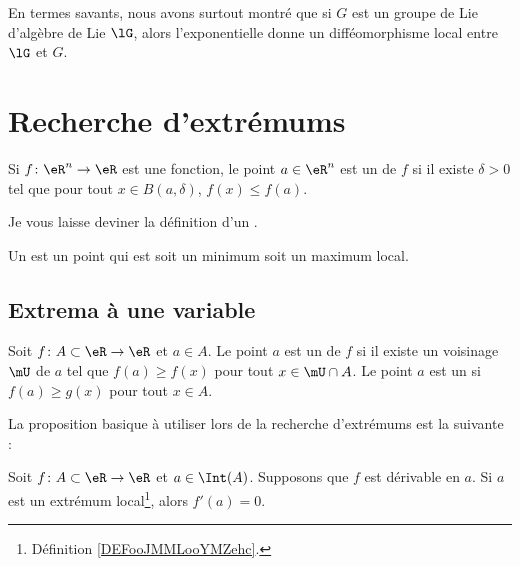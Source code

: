 \begin{remark}
    En termes savants, nous avons surtout montré que si \( G\) est un groupe de Lie d'algèbre de Lie \( \lG\), alors l'exponentielle donne un difféomorphisme local entre \( \lG\) et \( G\).
\end{remark}

\section{Recherche d'extrémums}

\begin{definition}      \label{DEFooJMMLooYMZehc}
    Si \( f\colon \eR^n\to \eR\) est une fonction, le point \( a\in \eR^n\) est un  de \( f\) si il existe \( \delta>0\) tel que pour tout \( x\in B(a,\delta)\), \( f(x)\leq f(a)\).
\end{definition}
    Je vous laisse deviner la définition d'un .
\begin{definition}
    Un  est un point qui est soit un minimum soit un maximum local.
\end{definition}

\subsection{Extrema à une variable}

\begin{definition}
    Soit \( f\colon A\subset \eR\to \eR\) et \( a\in A\). Le point \( a\) est un  de \( f\) si il existe un voisinage \( \mU\) de \( a\) tel que \( f(a)\geq f(x)\) pour tout \( x\in\mU\cap A\). Le point \( a\) est un  si \( f(a)\geq g(x)\) pour tout \( x\in A\).
\end{definition}

La proposition basique à utiliser lors de la recherche d'extrémums est la suivante :
\begin{proposition}     \label{PROPooNVKXooXtKkuz}
    Soit $f\colon A\subset\eR\to \eR$ et $a\in\Int(A)$. Supposons que $f$ est dérivable en $a$. Si $a$ est un extrémum local\footnote{Définition \ref{DEFooJMMLooYMZehc}.}, alors $f'(a)=0$.
\end{proposition}

